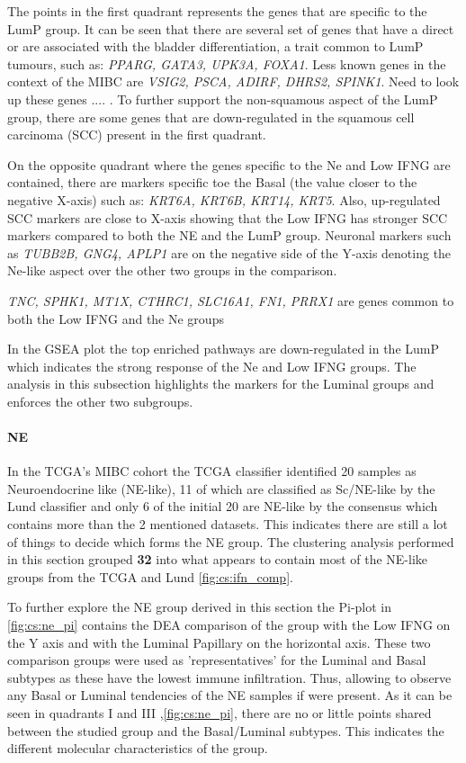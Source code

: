The points in the first quadrant represents the genes that are specific to the LumP group. It can be seen that there are several set of genes that have a direct or are associated with the bladder differentiation, a trait common to LumP tumours, such as: \textit{PPARG, GATA3, UPK3A, FOXA1}. Less known genes in the context of the MIBC are \textit{VSIG2, PSCA, ADIRF, DHRS2, SPINK1}. Need to look up these genes .... . To further support the non-squamous aspect of the LumP group, there are some genes that are down-regulated in the squamous cell carcinoma (SCC) \citet{Knowles2015-mu} present in the first quadrant.

On the opposite quadrant where the genes specific to the Ne and Low IFNG are contained, there are markers specific toe the Basal (the value closer to the negative X-axis) such as: \textit{KRT6A, KRT6B, KRT14, KRT5}. Also, up-regulated SCC markers are close to X-axis showing that the Low IFNG has stronger SCC markers compared to both the NE and the LumP group. Neuronal markers such as \textit{TUBB2B, GNG4, APLP1} are on the negative side of the Y-axis denoting the Ne-like aspect over the other two groups in the comparison.

\textit{TNC, SPHK1, MT1X, CTHRC1, SLC16A1, FN1, PRRX1} are genes common to both the Low IFNG and the Ne groups

In the GSEA plot the top enriched pathways are down-regulated in the LumP which indicates the strong response of the Ne and Low IFNG groups. The analysis in this subsection highlights the markers for the Luminal groups and enforces the other two subgroups.

\paragraph*{NE}


In the TCGA's MIBC cohort the TCGA classifier identified 20 samples as Neuroendocrine like (NE-like), 11 of which are classified as Sc/NE-like by the Lund classifier and only 6 of the initial 20 are NE-like by the consensus which contains more than the 2 mentioned datasets. This indicates there are still a lot of things to decide which forms the NE group. The clustering analysis performed in this section grouped \textbf{32} into what appears to contain most of the NE-like groups from the TCGA and Lund \cref{fig:cs:ifn_comp}.

To further explore the NE group derived in this section the Pi-plot in \cref{fig:cs:ne_pi} contains the DEA comparison of the group with the Low IFNG on the Y axis and with the Luminal Papillary on the horizontal axis. These two comparison groups were used as 'representatives' for the Luminal and Basal subtypes as these have the lowest immune infiltration. Thus, allowing to observe any Basal or Luminal tendencies of the NE samples if were present. As it can be seen in quadrants I and III ,\cref{fig:cs:ne_pi}, there are no or little points shared between the studied group and the Basal/Luminal subtypes. This indicates the different molecular characteristics of the group.

